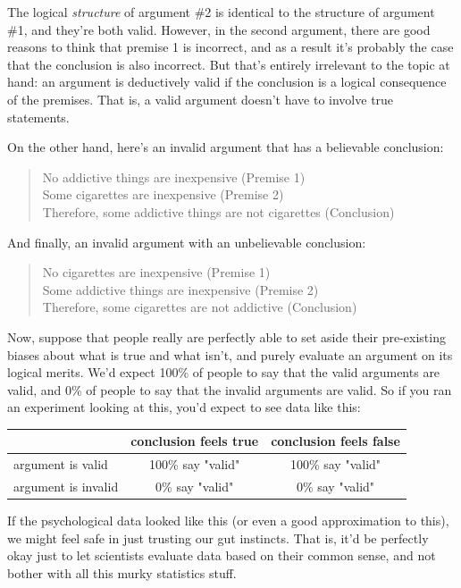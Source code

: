 \documentclass[
  11pt,
]{book}
\theoremstyle{indenteddefinition}
\theoremstyle{indenteddefinition}
\theoremstyle{definition}
\theoremstyle{definition}
\theoremstyle{remark}
\begin{document}
The logical \emph{structure} of argument \#2 is identical to the structure of argument \#1, and they're both valid. However, in the second argument, there are good reasons to think that premise 1 is incorrect, and as a result it's probably the case that the conclusion is also incorrect. But that's entirely irrelevant to the topic at hand: an argument is deductively valid if the conclusion is a logical consequence of the premises. That is, a valid argument doesn't have to involve true statements.

On the other hand, here's an invalid argument that has a believable conclusion:

\begin{quote}
No addictive things are inexpensive (Premise 1)\\
Some cigarettes are inexpensive (Premise 2)\\
Therefore, some addictive things are not cigarettes (Conclusion)
\end{quote}

And finally, an invalid argument with an unbelievable conclusion:

\begin{quote}
No cigarettes are inexpensive (Premise 1)\\
Some addictive things are inexpensive (Premise 2)\\
Therefore, some cigarettes are not addictive (Conclusion)
\end{quote}

Now, suppose that people really are perfectly able to set aside their pre-existing biases about what is true and what isn't, and purely evaluate an argument on its logical merits. We'd expect 100\% of people to say that the valid arguments are valid, and 0\% of people to say that the invalid arguments are valid. So if you ran an experiment looking at this, you'd expect to see data like this:

\begin{table}[H]
\centering
\begin{tabular}{lcc}
\toprule
  & conclusion feels true & conclusion feels false\\
\midrule
argument is valid & 100\% say "valid" & 100\% say "valid"\\
argument is invalid & 0\% say "valid" & 0\% say "valid"\\
\bottomrule
\end{tabular}
\end{table}

If the psychological data looked like this (or even a good approximation to this), we might feel safe in just trusting our gut instincts. That is, it'd be perfectly okay just to let scientists evaluate data based on their common sense, and not bother with all this murky statistics stuff.
\end{document}
